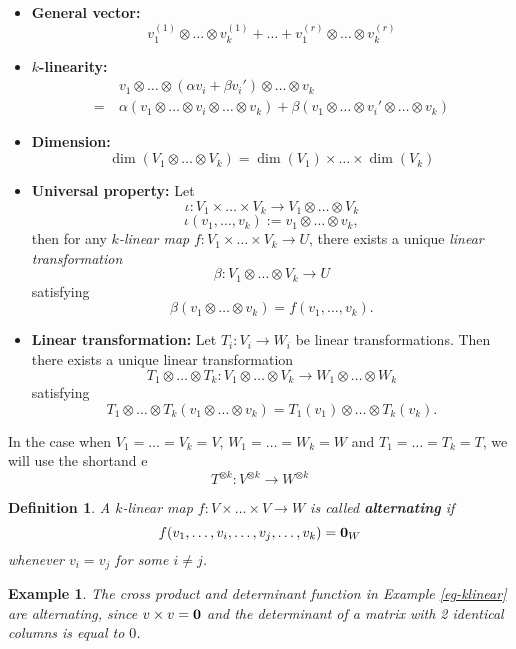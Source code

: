 \documentclass[12pt]{amsbook}
\newtheorem{definition}[theorem]{Definition}
\newtheorem{example}[theorem]{Example}
\begin{document}
\begin{itemize}
    \item {\bf General vector:}
    $$v_1^{(1)} \otimes \dots \otimes v_k^{(1)} + \dots + v_1^{(r)} \otimes \dots \otimes v_k^{(r)}$$
    \item {\bf $k$-linearity:}
    \begin{align*}
    &v_1 \otimes \dots \otimes (\alpha v_i + \beta v_i') \otimes \dots \otimes v_k\\ 
    =\ &\alpha(v_1 \otimes \dots \otimes v_i \otimes \dots \otimes v_k) + \beta(v_1 \otimes \dots \otimes v_i' \otimes \dots \otimes v_k)\end{align*}
    \item {\bf Dimension:}
    $$\dim(V_1 \otimes \dots \otimes V_k) = \dim(V_1) \times \dots \times \dim(V_k)$$
    \item {\bf Universal property:} Let 
    $$\iota: V_1 \times \dots \times V_k \to V_1 \otimes \dots \otimes V_k$$
    $$\iota(v_1, \dots, v_k) := v_1 \otimes \dots \otimes v_k,$$
    then for any {\it $k$-linear map} $f: V_1 \times \dots \times V_k \to U$, there exists a unique {\it linear transformation} 
    $$\beta: V_1 \otimes \dots \otimes V_k \to U$$
    satisfying
    $$\beta(v_1 \otimes \dots \otimes v_k) = f(v_1, \dots, v_k).$$
    \item {\bf Linear transformation:} Let $T_i: V_i \to W_i$ be linear transformations. Then there exists a unique linear transformation
    $$T_1 \otimes \dots \otimes T_k: V_1 \otimes \dots \otimes V_k \to W_1 \otimes \dots \otimes W_k$$
    satisfying
    $$T_1 \otimes \dots \otimes T_k(v_1 \otimes \dots \otimes v_k) = T_1(v_1) \otimes \dots \otimes T_k(v_k).$$
\end{itemize}
In the case when $V_1 = \dots = V_k = V$, $W_1 = \dots = W_k = W$ and $T_1 = \dots = T_k = T$, we will use the shortand e
$$T^{\otimes k} : V^{\otimes k}  \to W^{\otimes k}$$

\begin{definition} A $k$-linear map $f:V \times \dots \times V \to W$ is called {\bf alternating} if
$$f(v_1, \dots , v_i , \dots , v_j , \dots , v_k) = {\bf 0}_W$$
whenever $v_i = v_j$ for some $i \neq j$.
\end{definition}
\begin{example}
The cross product and determinant function in Example \ref{eg-klinear} are alternating, since $v \times v = {\bf 0}$ and the determinant of a matrix with 2 identical columns is equal to $0$.
\end{example}
\end{document}

